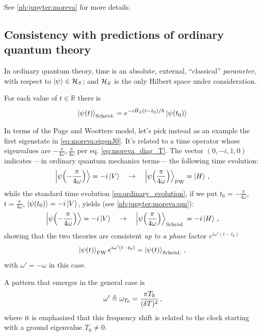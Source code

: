 See \ref{nb:jupyter:moreva} for more details.

\subsection{Consistency with predictions of ordinary quantum theory}

In ordinary quantum theory, time is an absolute, external, ``classical'' \emph{parameter},
with respect to $\ket{\psi} \in \mathcal{H}_S$; and $\mathcal{H}_S$
is the only Hilbert space under consideration.

For each value of $t \in \mathbb{R}$ there is
\begin{equation}\label{eq:ordinary_evolution}
  \ket{\psi(t)}_{\text{Schr\"od.}} =
  e^{-i\hat{H}_{S}(t-t_0)/\hbar}\ket{\psi(t_0)}
\end{equation}

In terms of the Page and Wootters model,
let's pick instead as an example the first eigenstate in \eqref{eq:moreva:eigenJ0}.
It's related to a time operator whose eigenvalues are
$-\frac{\pi}{4\omega}, \frac{\pi}{4\omega}$
per eq. \eqref{eq:moreva_diag_T}.
The vector $(0, -i, 1, 0)$ indicates ---in ordinary quantum mechanics terms---
the following time evolution:
\begin{equation}
  \ket{\psi\qty(-\frac{\pi}{4\omega})} = -i\ket{V}
  \quad \rightarrow \quad
  \ket{\psi\qty( \frac{\pi}{4\omega})}_{\mathrm{PW}} =   \ket{H}
  \, \text{,}
\end{equation}
while the standard time evolution \eqref{eq:ordinary_evolution}, if we put
$t_0 = -\frac{\pi}{4\omega}$, $t = \frac{\pi}{4\omega}$, $\ket{\psi\qty(t_0)} = -i\ket{V}$,
yields (see \ref{nb:jupyter:moreva:qm}):
\begin{equation}
  \ket{\psi\qty(-\frac{\pi}{4\omega})} = -i\ket{V}
  \quad \rightarrow \quad
  \ket{\psi\qty( \frac{\pi}{4\omega})}_{\mathrm{Schr\ddot{o}d.}} = -i\ket{H}
  \, \text{,}
\end{equation}
showing that the two theories are consistent \emph{up to a phase} factor
$e^{i\omega'(t - t_{0})}$
\begin{equation}
  \ket{\psi(t)}_{\mathrm{PW}} e^{i\omega'(t - t_{0})} = \ket{\psi(t)}_{\mathrm{Schr\ddot{o}d.}} \,\text{,}  
\end{equation}
with $\omega' = -\omega$ in this case.

A pattern that emerges in the general case is
\[
  \omega' \triangleq \omega_{T_{0}} = \frac{\pi T_0}{(\delta T)^2} \,\text{,}
\]
where it is emphasized that this frequency shift is related to the clock starting
with a ground eigenvalue $T_0 \ne 0$.

